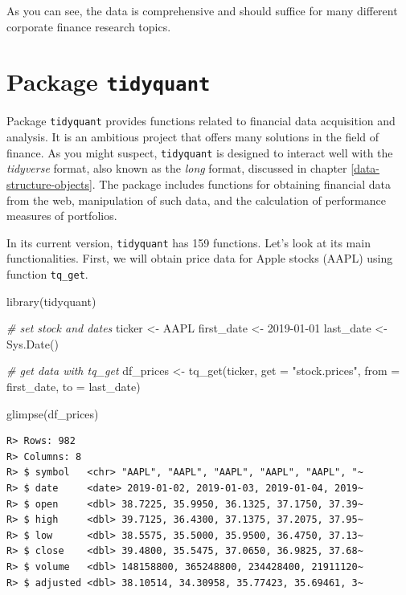 \documentclass[
  12pt,
]{book}
\newenvironment{Shaded}{\begin{snugshade}}{\end{snugshade}}
\newcommand{\AttributeTok}[1]{\textcolor[rgb]{0.61,0.61,0.61}{#1}}
\newcommand{\CommentTok}[1]{\textcolor[rgb]{0.37,0.37,0.37}{\textit{#1}}}
\newcommand{\FunctionTok}[1]{\textcolor[rgb]{0,0,0}{#1}}
\newcommand{\NormalTok}[1]{#1}
\newcommand{\OtherTok}[1]{\textcolor[rgb]{0.37,0.37,0.37}{#1}}
\newcommand{\StringTok}[1]{\textcolor[rgb]{0.5,0.5,0.5}{#1}}
\begin{document}
As you can see, the data is comprehensive and should suffice for many different corporate finance research topics.

\hypertarget{package-tidyquant}{%
\section{\texorpdfstring{Package \texttt{tidyquant}}{Package tidyquant}}\label{package-tidyquant}}

Package \texttt{tidyquant} \citep{R-tidyquant} provides functions related to financial data acquisition and analysis. It is an ambitious project that offers many solutions in the field of finance. As you might suspect, \texttt{tidyquant} is designed to interact well with the \emph{tidyverse} format, also known as the \emph{long} format, discussed in chapter \ref{data-structure-objects}. The package includes functions for obtaining financial data from the web, manipulation of such data, and the calculation of performance measures of portfolios. 

In its current version, \texttt{tidyquant} has 159 functions. Let's look at its main functionalities. First, we will obtain price data for Apple stocks (AAPL) using function \texttt{tq\_get}.

\begin{Shaded}
\begin{Highlighting}[]
\FunctionTok{library}\NormalTok{(tidyquant)}

\CommentTok{\# set stock and dates}
\NormalTok{ticker }\OtherTok{\textless{}{-}} \StringTok{\textquotesingle{}AAPL\textquotesingle{}}
\NormalTok{first\_date }\OtherTok{\textless{}{-}} \StringTok{\textquotesingle{}2019{-}01{-}01\textquotesingle{}}
\NormalTok{last\_date }\OtherTok{\textless{}{-}}  \FunctionTok{Sys.Date}\NormalTok{()}

\CommentTok{\# get data with tq\_get}
\NormalTok{df\_prices }\OtherTok{\textless{}{-}} \FunctionTok{tq\_get}\NormalTok{(ticker,}
                    \AttributeTok{get =} \StringTok{"stock.prices"}\NormalTok{, }
                    \AttributeTok{from =}\NormalTok{ first\_date, }
                    \AttributeTok{to =}\NormalTok{ last\_date)}

\FunctionTok{glimpse}\NormalTok{(df\_prices)}
\end{Highlighting}
\end{Shaded}

\begin{verbatim}
R> Rows: 982
R> Columns: 8
R> $ symbol   <chr> "AAPL", "AAPL", "AAPL", "AAPL", "AAPL", "~
R> $ date     <date> 2019-01-02, 2019-01-03, 2019-01-04, 2019~
R> $ open     <dbl> 38.7225, 35.9950, 36.1325, 37.1750, 37.39~
R> $ high     <dbl> 39.7125, 36.4300, 37.1375, 37.2075, 37.95~
R> $ low      <dbl> 38.5575, 35.5000, 35.9500, 36.4750, 37.13~
R> $ close    <dbl> 39.4800, 35.5475, 37.0650, 36.9825, 37.68~
R> $ volume   <dbl> 148158800, 365248800, 234428400, 21911120~
R> $ adjusted <dbl> 38.10514, 34.30958, 35.77423, 35.69461, 3~
\end{verbatim}
\end{document}
